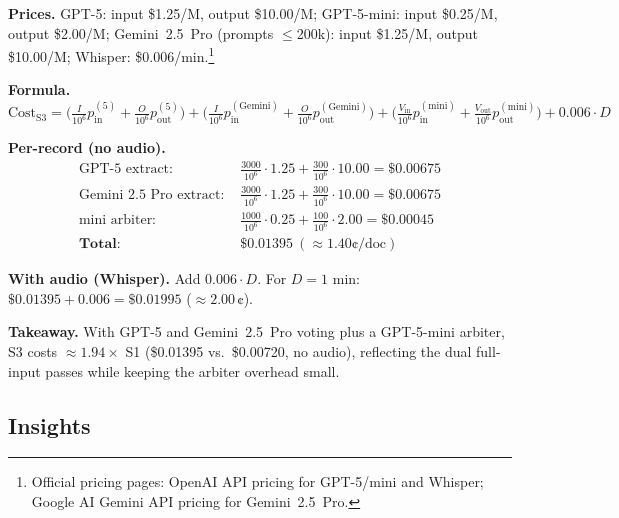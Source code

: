 \textbf{Prices.} GPT-5: input \$1.25/M, output \$10.00/M; GPT-5-mini: input \$0.25/M, output \$2.00/M; Gemini~2.5~Pro (prompts $\le$200k): input \$1.25/M, output \$10.00/M; Whisper: \$0.006/min.\footnote{Official pricing pages: OpenAI API pricing for GPT-5/mini and Whisper; Google AI Gemini API pricing for Gemini~2.5~Pro.}

\textbf{Formula.}
\[
\text{Cost}_{\text{S3}} =
\Big(\tfrac{I}{10^6}p_{\text{in}}^{(5)}+\tfrac{O}{10^6}p_{\text{out}}^{(5)}\Big)
+\Big(\tfrac{I}{10^6}p_{\text{in}}^{(\text{Gemini})}+\tfrac{O}{10^6}p_{\text{out}}^{(\text{Gemini})}\Big)
+\Big(\tfrac{V_{\text{in}}}{10^6}p_{\text{in}}^{(\text{mini})}+\tfrac{V_{\text{out}}}{10^6}p_{\text{out}}^{(\text{mini})}\Big)
+0.006\cdot D
\]

\textbf{Per-record (no audio).}
\[
\begin{aligned}
\text{GPT-5 extract: } & \tfrac{3000}{10^6}\!\cdot\!1.25 + \tfrac{300}{10^6}\!\cdot\!10.00 = \mathbf{\$0.00675} \\
\text{Gemini~2.5~Pro extract: } & \tfrac{3000}{10^6}\!\cdot\!1.25 + \tfrac{300}{10^6}\!\cdot\!10.00 = \mathbf{\$0.00675} \\
\text{mini arbiter: } & \tfrac{1000}{10^6}\!\cdot\!0.25 + \tfrac{100}{10^6}\!\cdot\!2.00 = \mathbf{\$0.00045} \\
\textbf{Total: } & \mathbf{\$0.01395}\ (\approx 1.40\text{¢/doc})
\end{aligned}
\]

\textbf{With audio (Whisper).} Add $0.006\cdot D$. For $D{=}1$ min: $\$0.01395+0.006=\mathbf{\$0.01995}$ (\(\approx 2.00\,\text{¢}\)).

\textbf{Takeaway.} With GPT-5 and Gemini~2.5~Pro voting plus a GPT-5-mini arbiter, S3 costs \(\approx 1.94\times\) S1 (\$0.01395 vs.\ \$0.00720, no audio), reflecting the dual full-input passes while keeping the arbiter overhead small.



\subsection*{Insights}

